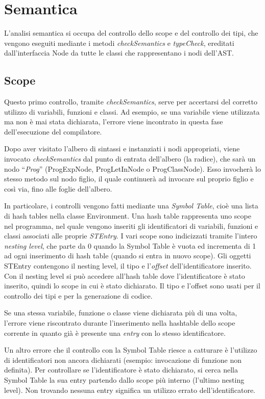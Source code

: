 \documentclass{scrreprt}
\begin{document}
\chapter{Semantica}
L'analisi semantica si occupa del controllo dello scope e del controllo dei tipi, che vengono eseguiti mediante i metodi \textit{checkSemantics} e \textit{typeCheck}, 
ereditati dall'interfaccia Node da tutte le classi che rappresentano i nodi dell'AST.

\section{Scope}
Questo primo controllo, tramite \textit{checkSemantics}, serve per accertarsi del corretto utilizzo di variabili, funzioni e classi. Ad esempio, se una variabile viene utilizzata
ma non è mai stata dichiarata, l'errore viene incontrato in questa fase dell'esecuzione del compilatore. 

Dopo aver visitato l'albero di sintassi e instanziati i nodi appropriati, 
viene invocato \textit{checkSemantics} dal punto di entrata dell'albero (la radice), che sarà un nodo ``\textit{Prog}'' (ProgExpNode, ProgLetInNode o ProgClassNode). 
Esso invocherà lo stesso metodo sul nodo figlio, il quale continuerà ad invocare sul proprio figlio e così via, fino alle foglie dell'albero.

In particolare, i controlli vengono fatti mediante una \textit{Symbol Table}, cioè una lista di hash tables nella classe Environment. Una hash table rappresenta uno scope nel programma,
nel quale vengono inseriti gli identificatori di variabili, funzioni e classi associati alle proprie \textit{STEntry}. I vari scope sono indicizzati tramite l'intero \textit{nesting level}, che parte da 0 quando 
la Symbol Table è vuota ed incrementa di 1 ad ogni inserimento di hash table (quando si entra in nuovo scope). Gli oggetti STEntry contengono il nesting level, il tipo e l'\textit{offset}
dell'identificatore inserito. Con il nesting level si può accedere all'hash table dove l'identificatore è stato inserito, quindi lo scope in cui è stato dichiarato. Il tipo e l'offset sono usati
per il controllo dei tipi e per la generazione di codice. 

Se una stessa variabile, funzione o classe viene dichiarata più di una volta, l'errore viene riscontrato durante l'inserimento
nella hashtable dello scope corrente in quanto già è presente una \textit{entry} con lo stesso identificatore. 

Un altro errore che il controllo con la Symbol Table riesce a catturare è l'utilizzo di identificatori non ancora dichiarati (esempio: invocazione di funzione non definita). 
Per controllare se l'identificatore è stato dichiarato, si cerca nella Symbol Table la sua entry partendo dallo scope più interno (l'ultimo nesting level). Non trovando nessuna entry
significa un utilizzo errato dell'identificatore.
\end{document}
